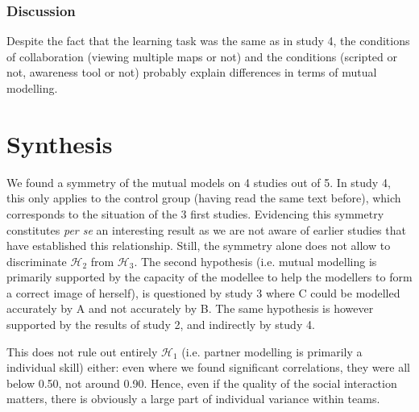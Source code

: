 \documentclass[natbib]{svjour3}
\newcommand{\ie}{i.e.\xspace}
\newcommand{\A}{A\xspace}
\newcommand{\B}{B\xspace}
\newcommand{\C}{C\xspace}
\newcommand{\gmodel}[2]{{$\mathcal{M}(#1, #2)$}}
\begin{document}

\subsubsection*{Discussion}

Despite the fact that the learning task was the same as in study 4, the
conditions of collaboration (viewing multiple maps or not) and the conditions
(scripted or not, awareness tool or not) probably explain differences in terms
of mutual modelling.

\section{Synthesis}

We found a symmetry of the mutual models on 4 studies out of 5. In study 4, this
only applies to the control group (having read the same text before), which
corresponds to the situation of the 3 first studies. Evidencing this symmetry
constitutes \textit{per se} an interesting result as we are not aware of earlier
studies that have established this relationship.
Still, the symmetry alone does not allow to discriminate $\mathcal{H}_{2}$ from
$\mathcal{H}_{3}$. The second hypothesis (\ie mutual modelling is primarily
supported by the capacity of the modellee to help the modellers to form a
correct image of herself), is questioned by study 3 where \C could be modelled
accurately by \A and not accurately by \B. The same hypothesis is however
supported by the results of study 2, and indirectly by study 4.

This does not rule out entirely $\mathcal{H}_{1}$ (\ie partner modelling is
primarily a individual skill) either: even where we found significant
correlations, they were all below 0.50, not around 0.90.  Hence, even if the
quality of the social interaction matters, there is obviously a large part of
individual variance within teams.
\end{document}

